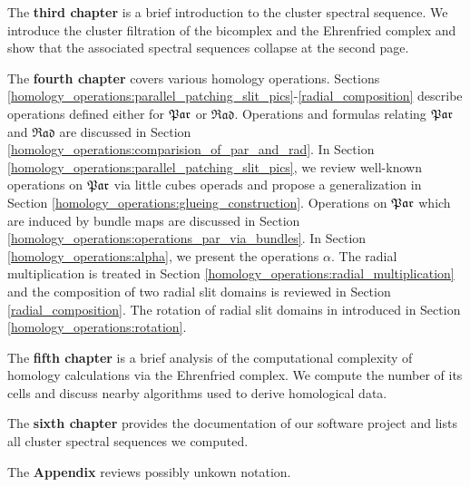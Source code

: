 The {\bf third chapter} is a brief introduction to the cluster spectral sequence.
We introduce the cluster filtration of the bicomplex and the Ehrenfried complex and show that the associated spectral sequences collapse at the second page.

The {\bf fourth chapter} covers various homology operations.
Sections \ref{homology_operations:parallel_patching_slit_pics}-\ref{radial_composition} describe operations defined either for $\mathfrak{Par}$ or $\mathfrak{Rad}$.
Operations and formulas relating $\mathfrak{Par}$ and $\mathfrak{Rad}$ are discussed in Section \ref{homology_operations:comparision_of_par_and_rad}.
In Section \ref{homology_operations:parallel_patching_slit_pics}, we review well-known operations on $\mathfrak{Par}$ via little cubes operads and propose a generalization in Section \ref{homology_operations:glueing_construction}.
Operations on $\mathfrak{Par}$ which are induced by bundle maps are discussed in Section \ref{homology_operations:operations_par_via_bundles}.
In Section \ref{homology_operations:alpha}, we present the operations $\alpha$.
The radial multiplication is treated in Section \ref{homology_operations:radial_multiplication} and
the composition of two radial slit domains is reviewed in Section \ref{radial_composition}.
The rotation of radial slit domains in introduced in Section \ref{homology_operations:rotation}.

The {\bf fifth chapter} is a brief analysis of the computational complexity of homology calculations via the Ehrenfried complex.
We compute the number of its cells and discuss nearby algorithms used to derive homological data.

The {\bf sixth chapter} provides the documentation of our software project and lists all cluster spectral sequences we computed.

The {\bf Appendix} reviews possibly unkown notation.